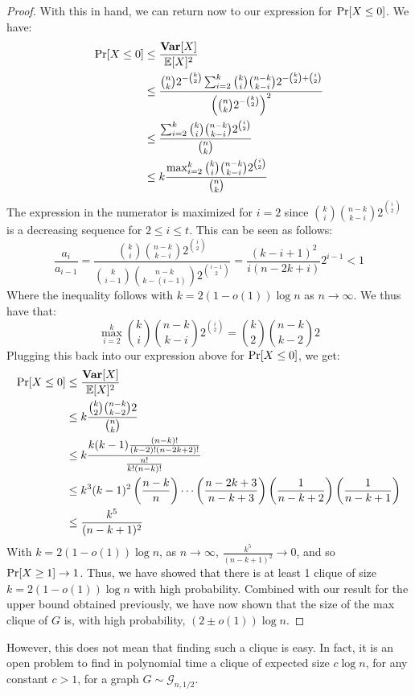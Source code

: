 \documentclass{article}
\begin{document}
\begin{proof}
    With this in hand, we can return now to our expression for $\textup{Pr}[X \leq 0]$. We
    have:
    \begin{align*}
        \textup{Pr}[X \leq 0] &\leq \frac{\mathbf{Var}[X]}{\mathbb{E}[X]^{2}}
        \\
        &\leq \frac{\binom{n}{k} 2^{- \binom{k}{2}} \sum_{i = 2}^{k} \binom{k}{i}
        \binom{n - k}{k - i} 2^{-\binom{k}{2} + \binom{i}{2}}}{\left(\binom{n}{k}
        2^{-\binom{k}{2}}\right)^{2}}
        \\
        &\leq \frac{\sum_{i = 2}^{k} \binom{k}{i}
        \binom{n - k}{k - i} 2^{\binom{i}{2}}}{\binom{n}{k}
        }
        \\
        &\leq k \frac{\max_{i = 2}^{k}\binom{k}{i}
        \binom{n - k}{k - i} 2^{\binom{i}{2}}}{\binom{n}{k}}
    \end{align*}
    The expression in the numerator is maximized for $i = 2$ since $\binom{k}{i}
    \binom{n - k}{k - i} 2^{\binom{i}{2}}$ is a decreasing sequence for $2 \leq
    i \leq t$. This can be seen as follows:
    \begin{equation*}
        \frac{a_{i}}{a_{i - 1}} =
        \frac{\binom{k}{i} \binom{n - k}{k - i}
            2^{\binom{i}{2}}}{\binom{k}{i - 1} \binom{n - k}{k - (i - 1)}
        2^{\binom{i - 1}{2}}} =
        \frac{(k - i + 1)^{2}}{i(n - 2k + i)} 2^{i - 1} <
        1
    \end{equation*}
    Where the inequality follows with $k = 2(1 - o(1)) \log{n}$ as $n \to \infty$.
    We thus have that:
    $$\max_{i = 2}^{k} \binom{k}{i} \binom{n - k}{k - i}
    2^{\binom{i}{2}} = \binom{k}{2} \binom{n - k}{k - 2} 2$$
    Plugging this back into our expression above for $\textup{Pr}[X \leq 0]$, we get:
    \begin{align*}
        \textup{Pr}[X \leq 0] &\leq \frac{\mathbf{Var}[X]}{\mathbb{E}[X]^{2}}
        \\
        &\leq k \frac{\binom{k}{2} \binom{n - k}{k - 2} 2}{\binom{n}{k}}
        \\
        &\leq k \frac{k(k - 1) \frac{(n - k)!}{(k - 2)!(n - 2k +
        2)!}}{\frac{n!}{k! (n - k)!}}
        \\
        &\leq k^{3} (k - 1)^{2} \left(\frac{n - k}{n}\right) \cdots \left(\frac{n -
    2k + 3}{n - k + 3}\right)
    \left(\frac{1}{n - k + 2}\right) \left(\frac{1}{n - k + 1}\right)
        \\
        &\leq \frac{k^{5}}{(n - k + 1)^{2}}
    \end{align*}
    With $k = 2(1 - o(1)) \log{n}$, as $n \to \infty$, $\frac{k^{5}}{(n - k +
    1)^{2}} \to 0$, and so $\textup{Pr}[X \geq 1] \to 1$. Thus, we have showed that there
    is at least 1 clique of size $k = 2(1 - o(1)) \log{n}$ with high probability.
    Combined with our result for the upper bound obtained previously, we have now
    shown that the size of the max clique of $G$ is, with high probability, $(2 \pm
    o(1)) \log{n}$.
\end{proof}
However, this does not mean that finding such a clique is easy.
In fact, it is an open problem to find in polynomial time a clique of expected
size $c \log{n}$, for any constant $c > 1$, for a graph $G \sim \mathcal{G}_{n,
1/2}$.
\end{document}
